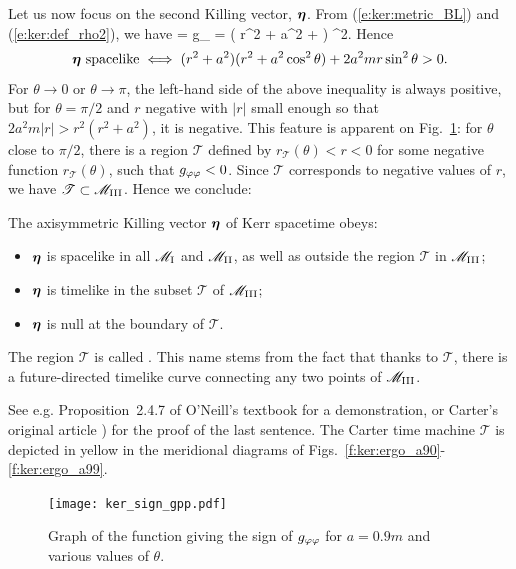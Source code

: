 Let us now focus on the second Killing vector, $\bm{\eta}$.
From (\ref{e:ker:metric_BL}) and (\ref{e:ker:def_rho2}), we have
\be \label{e:ker:eta_square}
    \w{\eta}\cdot\w{\eta} = g_{\ph\ph} = \left( r^2 + a^2 +  \right) \sin^2\th .
\ee
Hence
\[
    \w{\eta}\ \mbox{spacelike} \iff
        (r^2 + a^2)(r^2 + a^2\cos^2\th) + 2 a^2 m r \sin^2\th > 0 .
\]
For $\theta\rightarrow 0$ or $\theta\rightarrow\pi$, the left-hand side of the above inequality
is always positive, but for $\theta=\pi/2$ and $r$ negative with $|r|$
small enough so that $2 a^2 m |r| > r^2(r^2 + a^2)$, it is negative. This feature
is apparent on Fig.~\ref{f:ker:sign_gpp}: for $\theta$ close to $\pi/2$,
there is a region $\mathscr{T}$ defined by $r_{\mathscr{T}}(\theta) < r < 0$ for some
negative function $r_{\mathscr{T}}(\theta)$, such that $g_{\varphi\varphi}<0$.
Since $\mathscr{T}$ corresponds to negative values of $r$, we have
$\mathscr{T}\subset \mathscr{M}_{\rm III}$.
Hence we conclude:

\begin{prop}
The axisymmetric Killing vector $\bm{\eta}$ of Kerr spacetime obeys:
\begin{itemize}
\item $\bm{\eta}$ is spacelike in all $\mathscr{M}_{\rm I}$ and $\mathscr{M}_{\rm II}$, as well
as outside the region $\mathscr{T}$ in $\mathscr{M}_{\rm III}$;
\item $\bm{\eta}$ is timelike in the subset $\mathscr{T}$ of $\mathscr{M}_{\rm III}$;
\item $\bm{\eta}$ is null at the boundary of $\mathscr{T}$.
\end{itemize}
The region $\mathscr{T}$ is called
.
This name stems from the fact that thanks to $\mathscr{T}$, there is
a future-directed timelike curve connecting any two points of $\mathscr{M}_{\rm III}$.
\end{prop}
See e.g. Proposition~2.4.7 of O'Neill's textbook \cite{ONeil95} for a
demonstration, or Carter's original article \cite{Carte68a}) for the
proof of the last sentence.
The Carter time machine $\mathscr{T}$  is depicted in yellow in the meridional
diagrams of Figs.~\ref{f:ker:ergo_a90}-\ref{f:ker:ergo_a99}.


\begin{figure}
\centerline{\texttt{[image: ker\_sign\_gpp.pdf]}}
\caption[]{\label{f:ker:sign_gpp} \footnotesize
Graph of the function giving the sign of $g_{\varphi\varphi}$ for $a=0.9m$
and various values of $\theta$.}
\end{figure}


